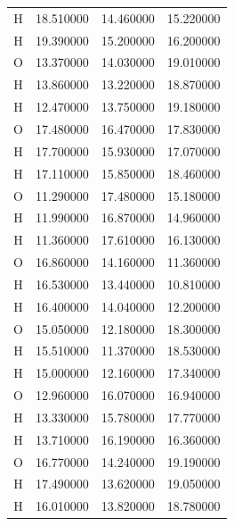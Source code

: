 \begin{longtable}{ c c c c }
	H &  18.510000 &  14.460000 &  15.220000 \\
	H &  19.390000 &  15.200000 &  16.200000 \\
	O &  13.370000 &  14.030000 &  19.010000 \\
	H &  13.860000 &  13.220000 &  18.870000 \\
	H &  12.470000 &  13.750000 &  19.180000 \\
	O &  17.480000 &  16.470000 &  17.830000 \\
	H &  17.700000 &  15.930000 &  17.070000 \\
	H &  17.110000 &  15.850000 &  18.460000 \\
	O &  11.290000 &  17.480000 &  15.180000 \\
	H &  11.990000 &  16.870000 &  14.960000 \\
	H &  11.360000 &  17.610000 &  16.130000 \\
	O &  16.860000 &  14.160000 &  11.360000 \\
	H &  16.530000 &  13.440000 &  10.810000 \\
	H &  16.400000 &  14.040000 &  12.200000 \\
	O &  15.050000 &  12.180000 &  18.300000 \\
	H &  15.510000 &  11.370000 &  18.530000 \\
	H &  15.000000 &  12.160000 &  17.340000 \\
	O &  12.960000 &  16.070000 &  16.940000 \\
	H &  13.330000 &  15.780000 &  17.770000 \\
	H &  13.710000 &  16.190000 &  16.360000 \\
	O &  16.770000 &  14.240000 &  19.190000 \\
	H &  17.490000 &  13.620000 &  19.050000 \\
	H &  16.010000 &  13.820000 &  18.780000 \\
    \hline
    \hline
\end{longtable}
\renewcommand*{\arraystretch}{1.0}
